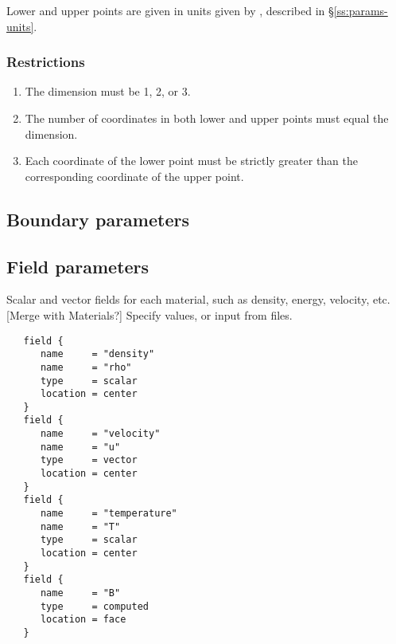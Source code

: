 Lower and upper points are given in units given by ,
described in \S\ref{ss:params-units}.

\subsubsection{Restrictions}

\begin{enumerate}
\item The dimension must be 1, 2, or 3.
\item The number of coordinates in both lower and upper points must equal the dimension.
\item Each coordinate of the lower point must be strictly greater than the corresponding coordinate of the upper point.
\end{enumerate}

\subsection{Boundary parameters}

\subsection{Field parameters}

Scalar and vector fields for each material, such as
 density, energy, velocity, etc.  [Merge with Materials?]  Specify
 values, or input from files.

\begin{verbatim}
   field {
      name     = "density"
      name     = "rho"
      type     = scalar
      location = center
   }
   field {
      name     = "velocity"
      name     = "u"
      type     = vector
      location = center
   }
   field {
      name     = "temperature"
      name     = "T"
      type     = scalar
      location = center
   }
   field {
      name     = "B"
      type     = computed
      location = face
   }
\end{verbatim}

